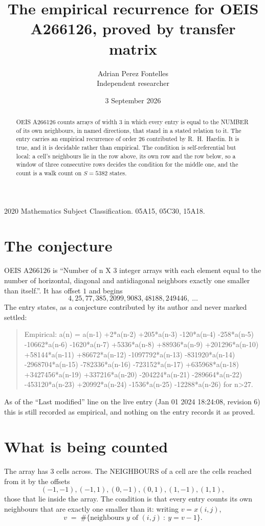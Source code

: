 \documentclass[11pt,a4paper]{article}
\title{The empirical recurrence for OEIS A266126, proved by transfer matrix}
\author{Adrian Perez Fontelles\\ \small Independent researcher}
\date{3 September 2026}
\theoremstyle{plain}
\theoremstyle{definition}
\begin{document}
\maketitle

\begin{abstract}
OEIS A266126 counts arrays of width $3$ in which every entry is equal to the NUMBER of its own
neighbours, in named directions, that stand in a stated relation to it. The entry carries an
empirical recurrence of order $26$ contributed by R.~H.~Hardin. It is true, and it is
decidable rather than empirical. The condition is self-referential but local: a cell's
neighbours lie in the row above, its own row and the row below, so a window of three
consecutive rows decides the condition for the middle one, and the count is a walk count on
$S=5382$ states.
\end{abstract}

\noindent\small 2020 Mathematics Subject Classification. 05A15, 05C30, 15A18.\normalsize

\section{The conjecture}

OEIS A266126 is ``Number of n X 3 integer arrays with each element equal to the number of horizontal, diagonal and antidiagonal neighbors exactly one smaller than itself.''. It has offset $1$ and begins
\[
4, 25, 77, 385, 2099, 9083, 48188, 249446,\ \dots
\]
The entry states, as a conjecture contributed by its author and never marked settled:
\begin{quote}
Empirical: a(n) = a(n-1) +2*a(n-2) +205*a(n-3) -120*a(n-4) -258*a(n-5) -10662*a(n-6) -1620*a(n-7) +5336*a(n-8) +88936*a(n-9) +201296*a(n-10) +58144*a(n-11) +86672*a(n-12) -1097792*a(n-13) -831920*a(n-14) -2968704*a(n-15) -782336*a(n-16) -723152*a(n-17) +635968*a(n-18) +3427456*a(n-19) +337216*a(n-20) -204224*a(n-21) -289664*a(n-22) -453120*a(n-23) +20992*a(n-24) -1536*a(n-25) -12288*a(n-26) for n>27.
\end{quote}
As of the ``Last modified'' line on the live entry (Jan 01 2024 18:24:08, revision 6) this is still
recorded as empirical, and nothing on the entry records it as proved.

\section{What is being counted}

The array has $3$ cells across. The NEIGHBOURS of a cell are the cells reached from it by the
offsets
\[
(-1,-1), (-1,1), (0,-1), (0,1), (1,-1), (1,1),
\]
those that lie inside the array. The condition is that every entry counts its own neighbours
that are exactly one smaller than it: writing $v=x(i,j)$,
\[
v\;=\;\#\{\text{neighbours } y \text{ of } (i,j)\ :\ y=v-1\} .
\]
\end{document}

